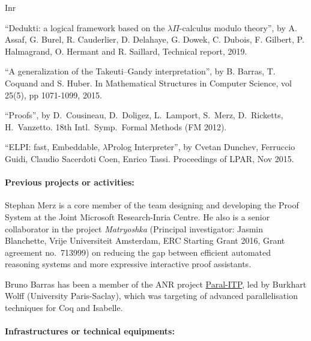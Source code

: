 \begin{sitedescription}{Inr}
\begin{compactitem}
\item ``Dedukti: a logical framework based on the $\lambda\Pi$-calculus modulo theory'', by A. Assaf, G. Burel, R. Cauderlier, D. Delahaye, G. Dowek, C. Dubois, F. Gilbert, P. Halmagrand, O. Hermant and R. Saillard, Technical report, 2019.
\item ``A generalization of the Takeuti–Gandy interpretation'', by B. Barras, T. Coquand and S. Huber. In Mathematical Structures in Computer Science, vol 25(5), pp 1071-1099, 2015.
\item ``\tlaplus Proofs'', by D.\ Cousineau, D.\ Doligez, L.\ Lamport, S.\ Merz, D.\  Ricketts, H.\ Vanzetto. 18th Intl.\ Symp.\ Formal Methods (FM 2012).
\item ``ELPI: fast, Embeddable, $\lambda$Prolog Interpreter'', by Cvetan Dunchev, Ferruccio Guidi, Claudio Sacerdoti Coen, Enrico Tassi. Proceedings of LPAR, Nov 2015.
\end{compactitem}

\paragraph*{Previous projects or activities:}


\begin{compactitem}
\item Stephan Merz is a core member of the team designing and developing the \tlaplus Proof System at the Joint Microsoft Research-Inria Centre. He also is a senior collaborator in the project \emph{Matryoshka} (Principal investigator: Jasmin Blanchette, Vrije Universiteit Amsterdam, ERC Starting Grant 2016, Grant agreement no.\ 713999) on reducing the gap between efficient automated reasoning systems and more expressive interactive proof assistants.
\item Bruno Barras has been a member of the ANR project
  \href{http://www.lri.fr/~wolff/projects/ANR-Paral-ITP/}{Paral-ITP}, led by Burkhart Wolff (University Paris-Saclay), which was targeting of advanced
  parallelisation techniques for Coq and Isabelle.
\end{compactitem}

\paragraph*{Infrastructures or technical equipments:}


\end{sitedescription}
